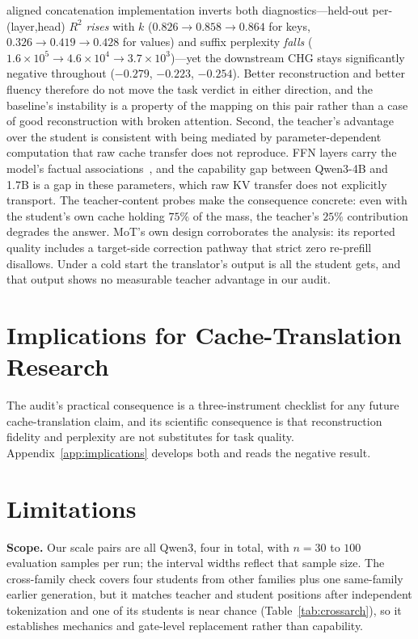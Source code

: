 \documentclass{article} %
\begin{document}
aligned concatenation implementation inverts both diagnostics---held-out
per-(layer,head) $R^2$ \emph{rises} with $k$ ($0.826 \to 0.858 \to 0.864$ for
keys, $0.326 \to 0.419 \to 0.428$ for values) and suffix perplexity
\emph{falls} ($1.6\times10^{5} \to 4.6\times10^{4} \to 3.7\times10^{3}$)---yet
the downstream CHG stays significantly negative throughout ($-0.279$, $-0.223$,
$-0.254$). Better reconstruction and better fluency therefore do not move the
task verdict in either direction, and the baseline's instability is a property
of the mapping on this pair rather than a case of good reconstruction with
broken attention. Second, the teacher's advantage over the student is consistent with
being mediated by parameter-dependent computation that raw cache transfer does
not reproduce. FFN layers carry the model's factual
associations~\citep{ffnmemory2021}, and the capability gap between Qwen3-4B
and 1.7B is a gap in these parameters, which raw KV transfer does not explicitly transport. The
teacher-content probes make the consequence concrete: even with the student's own
cache holding $75\%$ of the mass, the teacher's $25\%$ contribution degrades
the answer. MoT's own design corroborates the analysis: its reported quality
includes a target-side correction pathway that strict zero re-prefill disallows. Under a cold
start the translator's output is all the student gets, and that output shows
no measurable teacher advantage in our audit.

\section{Implications for Cache-Translation Research}
\label{sec:implications}
The audit's practical consequence is a three-instrument checklist for any
future cache-translation claim, and its scientific consequence is that
reconstruction fidelity and perplexity are not substitutes for task quality.
Appendix~\ref{app:implications} develops both and reads the negative result.

\section{Limitations}
\label{sec:limitations}
\textbf{Scope.} Our scale pairs are all Qwen3, four in total, with $n{=}30$ to
$100$ evaluation samples per run; the interval widths reflect that sample size.
The cross-family check covers four students from other families plus one
same-family earlier generation, but it matches teacher and student positions
after independent tokenization and one of its students is near chance
(Table~\ref{tab:crossarch}), so it establishes mechanics and gate-level
replacement rather than capability.
\end{document}
